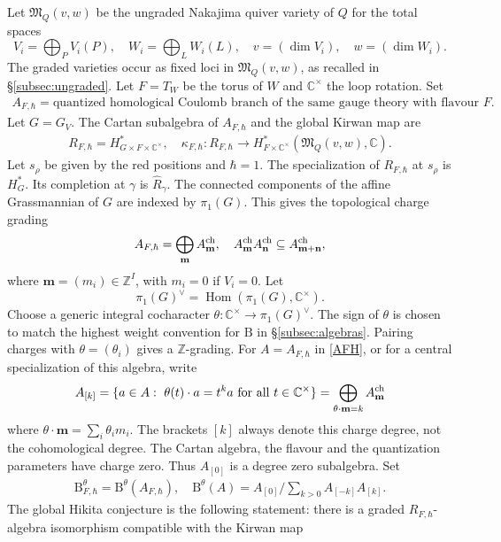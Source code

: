 \documentclass[11pt,reqno]{amsart}
\theoremstyle{definition}
\theoremstyle{remark}
\def\bbC{\mathbb C}
\def\bbZ{\mathbb Z}
\def\B{\mathrm B}
\def\Hom{\operatorname{Hom}}
\def\M{\mathfrak M}
\begin{document}
Let $\M_Q(v,w)$ be the ungraded Nakajima quiver variety of $Q$
for the total spaces
$$V_i=\bigoplus_PV_i(P),\quad W_i=\bigoplus_LW_i(L)
,\quad v=(\dim V_i)
,\quad
w=(\dim W_i).$$
The graded varieties occur as fixed loci in $\M_Q(v,w)$, as recalled in
\S\ref{subsec:ungraded}.
Let $F=T_W$ be the torus of $W$ and $\bbC^\times$ the loop rotation. 
Set 
\begin{align}\label{AFH}
A_{F,\hbar}=\text{quantized
homological Coulomb branch of the same gauge theory with flavour } F.
\end{align}
Let $G=G_V$.
The Cartan subalgebra of $A_{F,\hbar}$ and the global Kirwan map are
\begin{align}\label{GKM}
R_{F,\hbar}=H^*_{G\times F\times\bbC^\times}
,\quad
\kappa_{F,\hbar}:R_{F,\hbar}\to H^*_{F\times\bbC^\times}(\M_Q(v,w),\bbC).\end{align}
Let $s_\rho$ be given by the red positions and $\hbar=1$.
The specialization of $R_{F,\hbar}$ at  $s_\rho$ is $H^*_G$. 
Its completion at $\gamma$ is $\widehat R_\gamma$. 
The
connected components of the affine Grassmannian of $G$ are indexed by $\pi_1(G)$. 
This
gives the {topological charge grading}
\[
 A_{F,\hbar}=\bigoplus_{\mathbf m}A^{\rm ch}_{\mathbf m},\quad
 A^{\rm ch}_{\mathbf m}A^{\rm ch}_{\mathbf n}
 \subseteq A^{\rm ch}_{\mathbf m+\mathbf n},
\]
where $\mathbf m=(m_i)\in\bbZ^I$, with $m_i=0$ if $V_i=0$.
Let 
$$\pi_1(G)^\vee=\Hom(\pi_1(G),\bbC^\times).$$
Choose a generic integral cocharacter $\theta:\bbC^\times\to \pi_1(G)^\vee$. 
The sign of $\theta$ is chosen to match the highest weight convention for $\B$ in \S\ref{subsec:algebras}.
Pairing charges with $\theta=(\theta_i)$ gives a $\bbZ$-grading. 
For $A=A_{F,\hbar}$ in \eqref{AFH}, or for a central specialization of this algebra, write 
\begin{align}\label{[k]}A_{[k]}=\{a\in A:\ \theta(t)\cdot a=t^k a\text{ for all }t\in\bbC^\times\}
 =\bigoplus_{\theta\cdot\mathbf m=k}A^{\rm ch}_{\mathbf m}
\end{align}
where $\theta\cdot\mathbf m=\sum_i\theta_i m_i$.
The brackets $[k]$ always denote this charge degree, not the
cohomological degree. The Cartan algebra, the flavour
and the quantization parameters have charge zero. Thus
$A_{[0]}$ is a degree zero subalgebra. Set
\begin{align}\label{BTFH}
 \B^\theta_{F,\hbar}=\B^\theta(A_{F,\hbar}),\quad
 \B^\theta(A)=A_{[0]}\Big/\sum_{k>0}A_{[-k]}A_{[k]}.
\end{align}
The global Hikita conjecture is the following statement: 
there is a graded $R_{F,\hbar}$-algebra isomorphism compatible with the Kirwan map
\end{document}
